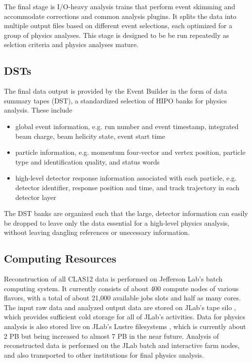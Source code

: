 \documentclass[3p,times,twocolumn]{elsarticle}
\begin{document}
The final stage is I/O-heavy analysis trains that perform event skimming and accommodate corrections and common analysis plugins.  It splits the data into multiple output files based on different event selections, each optimized for a group of physics analyses.  This stage is designed to be be run repeatedly as selction criteria and physics analyses mature.

\subsection{DSTs}\label{sec:dsts}
The final data output is provided by the Event Builder in the form of data summary tapes (DST), a standardized selection of HIPO banks for physics analysis.  These include
\begin{itemize}
    \item global event information, e.g. run number and event timestamp, integrated beam charge, beam helicity state, event start time
    \item particle information, e.g. momentum four-vector and vertex position, particle type and identification quality, and status words
    \item high-level detector response information associated with each particle, e.g. detector identifier, response position and time, and track trajectory in each detector layer
\end{itemize}
The DST banks are organized such that the large, detector information can easily be dropped to leave only the data essential for a high-level physics analysis, without leaving dangling references or unecessary information.

\subsection{Computing Resources}
Reconstruction of all CLAS12 data is performed on Jefferson Lab's batch computing system\cite{jlab-batch-farm}.  It currently consists of about 400 compute nodes of various flavors, with a total of about 21,000 available jobs slots and half as many cores.  The input raw data and analyzed output data are stored on JLab's tape silo \cite{jlab-tape-silo}, which provides sufficient cold storage for all of JLab's activities.  Data for physics analysis is also stored live on JLab's Lustre filesystems \cite{jlab-lustre}, which is currently about 2 PB but being increased to almost 7 PB in the near future.  Analysis of reconstructed data is performed on the JLab batch and interactive farm nodes, and also transported to other institutions for final physics analysis.
\end{document}
